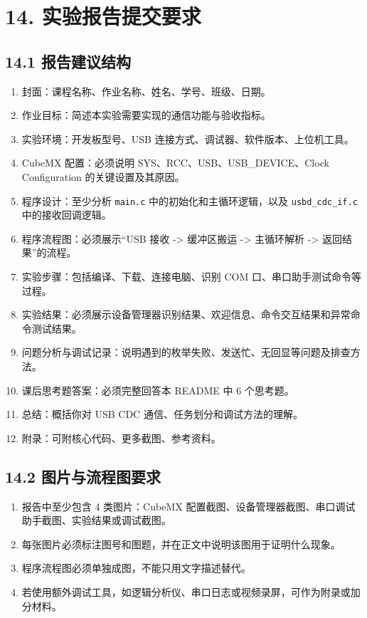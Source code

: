 \documentclass[
  chinese,
  UTF8,
  oneside,
  openany]{ctexbook}
\providecommand{\tightlist}{%
  \setlength{\itemsep}{0pt}\setlength{\parskip}{0pt}}
\begin{document}
\section{14.
实验报告提交要求}\label{ux5b9eux9a8cux62a5ux544aux63d0ux4ea4ux8981ux6c42}

\subsection{14.1
报告建议结构}\label{ux62a5ux544aux5efaux8baeux7ed3ux6784-3}

\begin{enumerate}
\def\labelenumi{\arabic{enumi}.}
\tightlist
\item
  封面：课程名称、作业名称、姓名、学号、班级、日期。
\item
  作业目标：简述本实验需要实现的通信功能与验收指标。
\item
  实验环境：开发板型号、USB 连接方式、调试器、软件版本、上位机工具。
\item
  CubeMX 配置：必须说明 SYS、RCC、USB、USB\_DEVICE、Clock Configuration
  的关键设置及其原因。
\item
  程序设计：至少分析 \texttt{main.c} 中的初始化和主循环逻辑，以及
  \texttt{usbd\_cdc\_if.c} 中的接收回调逻辑。
\item
  程序流程图：必须展示``USB 接收 -\textgreater{} 缓冲区搬运
  -\textgreater{} 主循环解析 -\textgreater{} 返回结果''的流程。
\item
  实验步骤：包括编译、下载、连接电脑、识别 COM
  口、串口助手测试命令等过程。
\item
  实验结果：必须展示设备管理器识别结果、欢迎信息、命令交互结果和异常命令测试结果。
\item
  问题分析与调试记录：说明遇到的枚举失败、发送忙、无回显等问题及排查方法。
\item
  课后思考题答案：必须完整回答本 README 中 6 个思考题。
\item
  总结：概括你对 USB CDC 通信、任务划分和调试方法的理解。
\item
  附录：可附核心代码、更多截图、参考资料。
\end{enumerate}

\subsection{14.2
图片与流程图要求}\label{ux56feux7247ux4e0eux6d41ux7a0bux56feux8981ux6c42-3}

\begin{enumerate}
\def\labelenumi{\arabic{enumi}.}
\tightlist
\item
  报告中至少包含 4 类图片：CubeMX
  配置截图、设备管理器截图、串口调试助手截图、实验结果或调试截图。
\item
  每张图片必须标注图号和图题，并在正文中说明该图用于证明什么现象。
\item
  程序流程图必须单独成图，不能只用文字描述替代。
\item
  若使用额外调试工具，如逻辑分析仪、串口日志或视频录屏，可作为附录或加分材料。
\end{enumerate}
\end{document}
